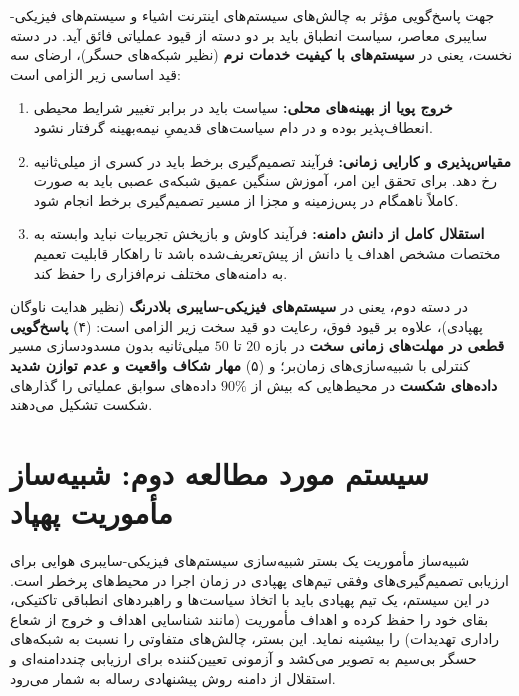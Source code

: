 \documentclass[oneside,openany,phd]{TMU-Thesis}
\begin{document}
جهت پاسخ‌گویی مؤثر به چالش‌های سیستم‌های اینترنت اشیاء و سیستم‌های فیزیکی-سایبری معاصر، سیاست انطباق باید بر دو دسته از قیود عملیاتی فائق آید. در دسته نخست، یعنی در \textbf{سیستم‌های با کیفیت خدمات نرم} (نظیر شبکه‌های حسگر)، ارضای سه قید اساسی زیر الزامی است:
\begin{enumerate}
    \item \textbf{خروج پویا از بهینه‌های محلی:} سیاست باید در برابر تغییر شرایط محیطی انعطاف‌پذیر بوده و در دام سیاست‌های قدیمیِ نیمه‌بهینه گرفتار نشود.
    \item \textbf{مقیاس‌پذیری و کارایی زمانی:} فرآیند تصمیم‌گیری برخط باید در کسری از میلی‌ثانیه رخ دهد. برای تحقق این امر، آموزش سنگین عمیق شبکه‌ی عصبی باید به صورت کاملاً ناهمگام در پس‌زمینه و مجزا از مسیر تصمیم‌گیری برخط انجام شود.
    \item \textbf{استقلال کامل از دانش دامنه:} فرآیند کاوش و بازپخش تجربیات نباید وابسته به مختصات مشخص اهداف یا دانش از پیش‌تعریف‌شده باشد تا راهکار قابلیت تعمیم به دامنه‌های مختلف نرم‌افزاری را حفظ کند.
\end{enumerate}

در دسته دوم، یعنی در \textbf{سیستم‌های فیزیکی-سایبری بلادرنگ} (نظیر هدایت ناوگان پهپادی)، علاوه بر قیود فوق، رعایت دو قید سخت زیر الزامی است: (۴) \textbf{پاسخ‌گویی قطعی در مهلت‌های زمانی سخت} در بازه $20$ تا $50$ میلی‌ثانیه بدون مسدودسازی مسیر کنترلی با شبیه‌سازی‌های زمان‌بر؛ و (۵) \textbf{مهار شکاف واقعیت و عدم توازن شدید داده‌های شکست} در محیط‌هایی که بیش از $90\%$ داده‌های سوابق عملیاتی را گذارهای شکست تشکیل می‌دهند.

\section{سیستم مورد مطالعه دوم: شبیه‌ساز مأموریت پهپاد }
\label{sec:study_case_dartsim}

شبیه‌ساز مأموریت  \cite{MorenoDART2019} یک بستر شبیه‌سازی سیستم‌های فیزیکی-سایبری هوایی برای ارزیابی تصمیم‌گیری‌های وفقی تیم‌های پهپادی در زمان اجرا در محیط‌های پرخطر است. در این سیستم، یک تیم پهپادی باید با اتخاذ سیاست‌ها و راهبردهای انطباقی تاکتیکی، بقای خود را حفظ کرده و اهداف مأموریت (مانند شناسایی اهداف و خروج از شعاع راداری تهدیدات) را بیشینه نماید. این بستر، چالش‌های متفاوتی را نسبت به شبکه‌های حسگر بی‌سیم به تصویر می‌کشد و آزمونی تعیین‌کننده برای ارزیابی چنددامنه‌ای و استقلال از دامنه روش پیشنهادی رساله به شمار می‌رود.
\end{document}
